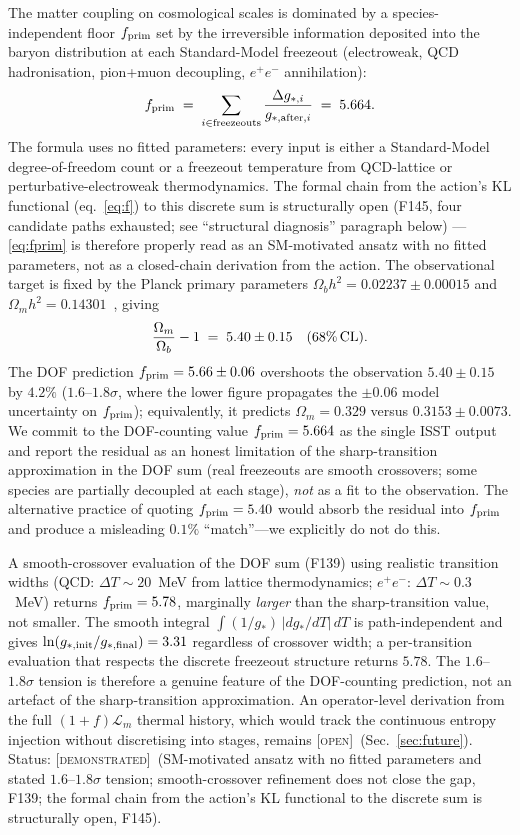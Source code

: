 \documentclass[aps,prd,twocolumn,nofootinbib,floatfix,superscriptaddress]{revtex4-2}
\newcommand{\DEMO}{{\color{black!70!blue}\textsc{[demonstrated]}}}
\newcommand{\OPEN}{{\color{black!60!red}\textsc{[open]}}}
\newcommand{\Lm}{\mathcal{L}_m}
\newcommand{\fprim}{f_{\rm prim}}
\begin{document}
The matter coupling on cosmological scales is dominated by a
species-independent floor $\fprim$ set by the irreversible
information deposited into the baryon distribution at each
Standard-Model freezeout (electroweak, QCD hadronisation,
pion+muon decoupling, $e^+e^-$ annihilation):
\begin{equation}
\label{eq:fprim}
\fprim \;=\; \sum_{i\in{\rm freezeouts}}
\frac{\Delta g_{*,i}}{g_{*,{\rm after},i}} \;=\; 5.664.
\end{equation}
The formula uses no fitted parameters: every input is either a
Standard-Model degree-of-freedom count or a freezeout temperature
from QCD-lattice or perturbative-electroweak thermodynamics. The
formal chain from the action's KL functional (eq.~\ref{eq:f}) to
this discrete sum is structurally open (F145, four candidate paths
exhausted; see ``structural diagnosis'' paragraph below) ---
\eqref{eq:fprim} is therefore properly read as an SM-motivated
ansatz with no fitted parameters, not as a closed-chain derivation
from the action. The observational target is fixed by the Planck
primary parameters
$\Omega_b h^2 = 0.02237\pm 0.00015$ and $\Omega_m h^2 =
0.14301$~\cite{Planck2018}, giving
\begin{equation}
\frac{\Omega_m}{\Omega_b} - 1 \;=\; 5.40\pm 0.15\quad (68\%\,{\rm CL}).
\end{equation}
The DOF prediction $\fprim = 5.66\pm 0.06$ overshoots the observation
$5.40\pm 0.15$ by $4.2\%$ ($1.6$--$1.8\sigma$, where the lower
figure propagates the $\pm 0.06$ model uncertainty on $\fprim$);
equivalently, it predicts $\Omega_m = 0.329$ versus $0.3153\pm 0.0073$. We commit to the
DOF-counting value $\fprim = 5.664$ as the single ISST output and
report the residual as an honest limitation of the
sharp-transition approximation in the DOF sum (real freezeouts are
smooth crossovers; some species are partially decoupled at each
stage), \emph{not} as a fit to the observation. The alternative
practice of quoting $\fprim = 5.40$ would absorb the residual into
$\fprim$ and produce a misleading $0.1\%$ ``match''---we explicitly
do not do this.

A smooth-crossover evaluation of the DOF sum (F139) using realistic
transition widths (QCD: $\Delta T \sim 20$~MeV from lattice
thermodynamics; $e^+e^-$: $\Delta T \sim 0.3$~MeV) returns
$\fprim = 5.78$, marginally \emph{larger} than the sharp-transition
value, not smaller. The smooth integral $\int (1/g_*)\,|dg_*/dT|\,dT$
is path-independent and gives $\ln(g_{*,{\rm init}}/g_{*,{\rm final}})
= 3.31$ regardless of crossover width; a per-transition evaluation
that respects the discrete freezeout structure returns $5.78$.
The $1.6$--$1.8\sigma$ tension is therefore a genuine feature of
the DOF-counting prediction, not an artefact of the sharp-transition
approximation. An operator-level derivation from the full
$(1{+}f)\Lm$ thermal history, which would track the continuous
entropy injection without discretising into stages, remains
\OPEN\ (Sec.~\ref{sec:future}). Status: \DEMO\ (SM-motivated ansatz
with no fitted parameters and stated $1.6$--$1.8\sigma$ tension;
smooth-crossover refinement does not close the gap, F139; the
formal chain from the action's KL functional to the discrete sum
is structurally open, F145).
\end{document}
